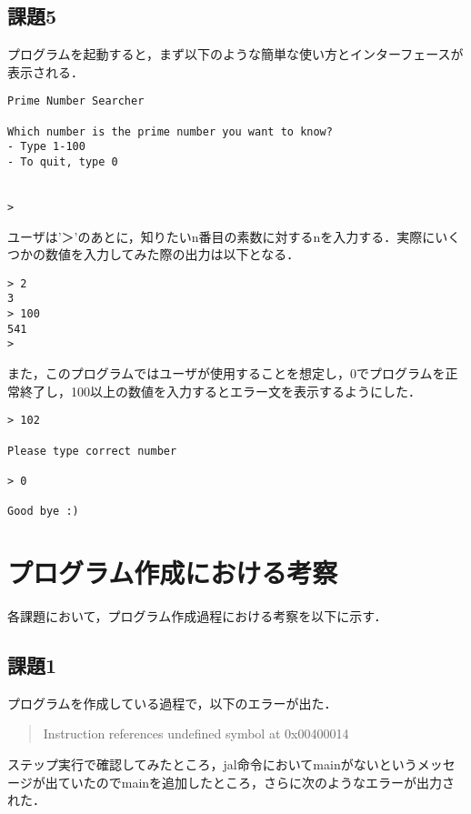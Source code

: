 \documentclass[a4j]{jarticle}
\begin{document}
\subsection{課題5}

プログラムを起動すると，まず以下のような簡単な使い方とインターフェースが表示される．

{\baselineskip 3mm
\begin{verbatim}
Prime Number Searcher

Which number is the prime number you want to know?
- Type 1-100
- To quit, type 0


> 
\end{verbatim}
}

ユーザは'＞'のあとに，知りたいn番目の素数に対するnを入力する．実際にいくつかの数値を入力してみた際の出力は以下となる．

{\baselineskip 3mm
\begin{verbatim}
> 2
3
> 100
541
> 
\end{verbatim}
}

また，このプログラムではユーザが使用することを想定し，0でプログラムを正常終了し，100以上の数値を入力するとエラー文を表示するようにした．

{\baselineskip 3mm
\begin{verbatim}
> 102

Please type correct number

> 0

Good bye :)
\end{verbatim}
}





%
%

\section{プログラム作成における考察}

各課題において，プログラム作成過程における考察を以下に示す．

\subsection{課題1}

プログラムを作成している過程で，以下のエラーが出た．

\begin{quote}
Instruction references undefined symbol at 0x00400014
\end{quote}

ステップ実行で確認してみたところ，jal命令においてmainがないというメッセージが出ていたのでmainを追加したところ，さらに次のようなエラーが出力された．
\end{document}
